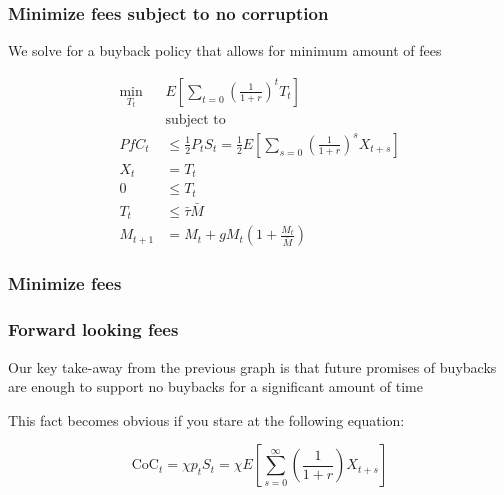 \documentclass[10pt]{beamer}
\begin{document}
  \begin{frame} \frametitle{Minimize fees subject to no corruption}

    We solve for a buyback policy that allows for minimum amount of fees

    \begin{align*}
      \min_{T_t} \; &E \left[ \sum_{t=0} \left(\frac{1}{1 + r} \right)^t T_t \right] \\
      &\text{subject to} \\
      PfC_t &\leq \frac{1}{2} P_t S_t = \frac{1}{2} E \left[ \sum_{s=0} \left(\frac{1}{1 + r}\right)^s  X_{t + s} \right] \\
      X_{t} &= T_t \\
      0 &\leq T_t \\
      T_t &\leq \bar{\tau} \bar{M} \\
      M_{t+1} &= M_{t} + g M_{t} \left(1 + \frac{M_t}{\bar{M}} \right)
    \end{align*}

  \end{frame}

  \begin{frame} \frametitle{Minimize fees}

    \begin{figure}
      \label{fig:dg_tax_growth}
    \end{figure}

  \end{frame}

  \begin{frame} \frametitle{Forward looking fees}

    Our key take-away from the previous graph is that future promises of buybacks are enough to
    support no buybacks for a significant amount of time

    This fact becomes obvious if you stare at the following equation:

    $$\text{CoC}_t = \chi p_t S_t = \chi E \left[ \sum_{s=0}^\infty \left(\frac{1}{1+r}\right) X_{t+s} \right]$$

  \end{frame}
\end{document}
